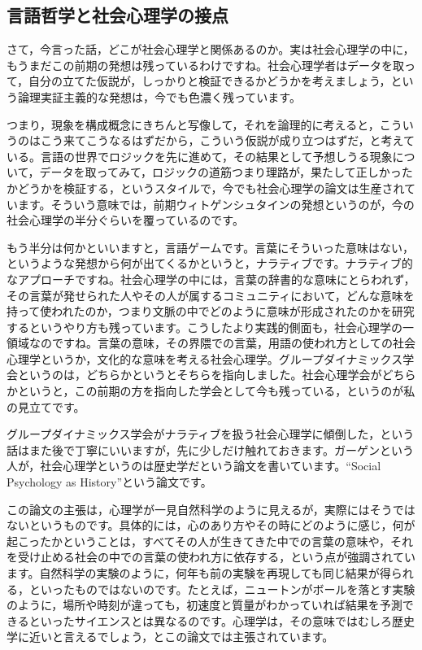 \documentclass{ltjsbook}
\begin{document}
\subsection{言語哲学と社会心理学の接点}
さて，今言った話，どこが社会心理学と関係あるのか。実は社会心理学の中に，もうまだこの前期の発想は残っているわけですね。社会心理学者はデータを取って，自分の立てた仮説が，しっかりと検証できるかどうかを考えましょう，という論理実証主義的な発想は，今でも色濃く残っています。

つまり，現象を構成概念にきちんと写像して，それを論理的に考えると，こういうのはこう来てこうなるはずだから，こういう仮説が成り立つはずだ，と考えている。言語の世界でロジックを先に進めて，その結果として予想しうる現象について，データを取ってみて，ロジックの道筋つまり理路が，果たして正しかったかどうかを検証する，というスタイルで，今でも社会心理学の論文は生産されています。そういう意味では，前期ウィトゲンシュタインの発想というのが，今の社会心理学の半分ぐらいを覆っているのです。

もう半分は何かといいますと，言語ゲームです。言葉にそういった意味はない，というような発想から何が出てくるかというと，ナラティブです。ナラティブ的なアプローチですね。社会心理学の中には，言葉の辞書的な意味にとらわれず，その言葉が発せられた人やその人が属するコミュニティにおいて，どんな意味を持って使われたのか，つまり文脈の中でどのように意味が形成されたのかを研究するというやり方も残っています。こうしたより実践的側面も，社会心理学の一領域なのですね。言葉の意味，その界隈での言葉，用語の使われ方としての社会心理学というか，文化的な意味を考える社会心理学。グループダイナミックス学会というのは，どちらかというとそちらを指向しました。社会心理学会がどちらかというと，この前期の方を指向した学会として今も残っている，というのが私の見立てです。

グループダイナミックス学会がナラティブを扱う社会心理学に傾倒した，という話はまた後で丁寧にいいますが，先に少しだけ触れておきます。ガーゲンという人が，社会心理学というのは歴史学だという論文を書いています。``Social Psychology as History''という論文です\parencite{gergen1973social}。

この論文の主張は，心理学が一見自然科学のように見えるが，実際にはそうではないというものです。具体的には，心のあり方やその時にどのように感じ，何が起こったかということは，すべてその人が生きてきた中での言葉の意味や，それを受け止める社会の中での言葉の使われ方に依存する，という点が強調されています。自然科学の実験のように，何年も前の実験を再現しても同じ結果が得られる，といったものではないのです。たとえば，ニュートンがボールを落とす実験のように，場所や時刻が違っても，初速度と質量がわかっていれば結果を予測できるといったサイエンスとは異なるのです。心理学は，その意味ではむしろ歴史学に近いと言えるでしょう，とこの論文では主張されています。
\end{document}
